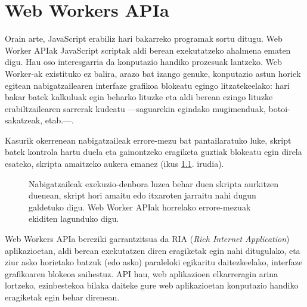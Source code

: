 \chapter{Web Workers APIa}
Orain arte, JavaScript erabiliz hari bakarreko programak sortu ditugu. Web Worker APIak JavaScript scriptak aldi berean exekutatzeko ahalmena ematen digu. Hau oso interesgarria da konputazio handiko prozesuak lantzeko. Web Worker-ak existituko ez balira, arazo bat izango genuke, konputazio astun horiek egitean nabigatzailearen interfaze grafikoa blokeatu egingo litzatekeelako: hari bakar batek kalkuluak egin beharko lituzke eta aldi berean ezingo lituzke erabiltzailearen sarrerak kudeatu —saguarekin egindako mugimenduak, botoi-sakatzeak, etab.—.

Kasurik okerrenean nabigatzaileak errore-mezu bat pantailaratuko luke, skript batek kontrola hartu duela eta gainontzeko eragiketa guztiak blokeatu egin direla esateko, skripta amaitzeko aukera emanez (ikus \ref{fig:webworker1}. irudia).

\begin{figure}[ht]
	\centering
{}
\caption{Nabigatzaileak exekuzio-denbora luzea behar duen skripta aurkitzen duenean, skript hori amaitu edo itxaroten jarraitu nahi dugun galdetuko digu. Web Worker APIak horrelako errore-mezuak ekiditen lagunduko digu.}
\label{fig:webworker1}
\end{figure}

Web Workers APIa bereziki garrantzitsua da RIA (\textit{Rich Internet Application}) aplikazioetan, aldi berean exekutatzen diren eragiketak egin nahi ditugulako, eta ziur asko horietako batzuk (edo asko) paraleloki egikaritu daitezkeelako, interfaze grafikoaren blokeoa saihestuz. API hau, web aplikazioen elkarreragin arina lortzeko, ezinbestekoa bilaka daiteke gure web aplikazioetan konputazio handiko eragiketak egin behar direnean.

